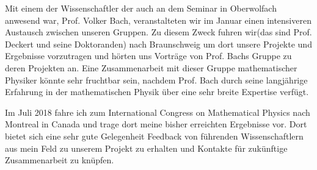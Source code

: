 \documentclass[a4paper,12pt]{article}
\begin{document}
Mit einem der Wissenschaftler der auch an dem Seminar in Oberwolfach anwesend war, Prof. Volker Bach, veranstalteten wir im Januar einen intensiveren Austausch zwischen unseren Gruppen. Zu diesem Zweck fuhren wir(das sind Prof. Deckert und seine Doktoranden) nach Braunschweig um dort unsere Projekte und Ergebnisse vorzutragen und hörten uns Vorträge von Prof. Bachs Gruppe zu deren Projekten an. 
Eine Zusammenarbeit mit dieser Gruppe mathematischer Physiker könnte sehr fruchtbar sein, nachdem Prof. Bach durch seine langjährige Erfahrung in der mathematischen Physik über eine sehr breite Expertise verfügt. 

Im Juli 2018 fahre ich zum International Congress on Mathematical Physics nach Montreal in Canada und trage dort 
meine bisher erreichten Ergebnisse vor. Dort bietet sich eine sehr gute Gelegenheit Feedback von führenden Wissenschaftlern
aus mein Feld zu unserem Projekt zu erhalten und Kontakte für zukünftige Zusammenarbeit zu knüpfen.
\end{document}

